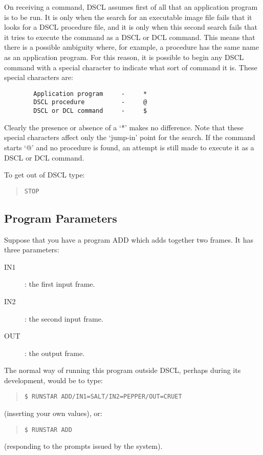 On receiving a command, DSCL assumes first of all that an application program
is to be run.
It is only when the search for an executable image file fails that it looks for
a DSCL procedure file, and it is only when this second search fails that it
tries to execute the command as a DSCL or DCL command.
This means that there is a possible ambiguity where, for example, a
procedure has the same name as an application program.
For this reason, it is possible to begin any DSCL command with a special
character to indicate what sort of command it is.
These special characters are:
\begin{verbatim}
        Application program     -     *
        DSCL procedure          -     @
        DSCL or DCL command     -     $
\end{verbatim}
Clearly the presence or absence of a `*' makes no difference.
Note that these special characters affect only the `jump-in' point for the
search.
If the command starts `@' and no procedure is found, an attempt is still
made to execute it as a DSCL or DCL command.

To get out of DSCL type:
\begin{quote}
{\tt STOP}
\end{quote}
\subsection {Program Parameters}
Suppose that you have a program ADD which adds together two frames.
It has three parameters:
\begin{description}
\item [IN1]: the first input frame.
\item [IN2]: the second input frame.
\item [OUT]: the output frame.
\end{description}
The normal way of running this program outside DSCL, perhaps during its
development, would be to type:
\begin{quote}
{\tt \$ RUNSTAR ADD/IN1=SALT/IN2=PEPPER/OUT=CRUET}
\end{quote}
(inserting your own values), or:
\begin{quote}
{\tt \$ RUNSTAR ADD}
\end{quote}
(responding to the prompts issued by the system).

